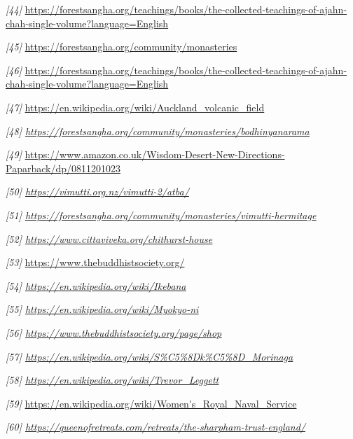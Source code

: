 \emph{{[}44{]}}
\url{https://forestsangha.org/teachings/books/the-collected-teachings-of-ajahn-chah-single-volume?language=English}

\emph{{[}45{]}} \url{https://forestsangha.org/community/monasteries}

\emph{{[}46{]}}
\url{https://forestsangha.org/teachings/books/the-collected-teachings-of-ajahn-chah-single-volume?language=English}

\emph{{[}47{]}}
\url{https://en.wikipedia.org/wiki/Auckland_volcanic_field}

\emph{{[}48{]}
\href{https://forestsangha.org/community/monasteries/bodhinyanarama}{\underline{https://forestsangha.org/community/monasteries/bodhinyanarama}}}

\emph{{[}49{]}}
\url{https://www.amazon.co.uk/Wisdom-Desert-New-Directions-Paparback/dp/0811201023}

\emph{{[}50{]}
\href{https://vimutti.org.nz/vimutti-2/atba/}{\underline{https://vimutti.org.nz/vimutti-2/atba/}}}

\emph{{[}51{]}
\href{https://forestsangha.org/community/monasteries/vimutti-hermitage}{\underline{https://forestsangha.org/community/monasteries/vimutti-hermitage}}}

\emph{{[}52{]}
\href{https://www.cittaviveka.org/chithurst-house}{\underline{https://www.cittaviveka.org/chithurst-house}}}

\emph{{[}53{]}} \url{https://www.thebuddhistsociety.org/}

\emph{{[}54{]}
\href{https://en.wikipedia.org/wiki/Ikebana}{\underline{https://en.wikipedia.org/wiki/Ikebana}}}

\emph{{[}55{]}
\href{https://en.wikipedia.org/wiki/Myokyo-ni}{\underline{https://en.wikipedia.org/wiki/Myokyo-ni}}}

\emph{{[}56{]}
\href{https://www.thebuddhistsociety.org/page/shop}{\underline{https://www.thebuddhistsociety.org/page/shop}}}

\emph{{[}57{]}
\href{https://en.wikipedia.org/wiki/Sōkō_Morinaga}{\underline{https://en.wikipedia.org/wiki/S\%C5\%8Dk\%C5\%8D\_Morinaga}}}

\emph{{[}58{]}
\href{https://en.wikipedia.org/wiki/Trevor_Leggett}{\underline{https://en.wikipedia.org/wiki/Trevor\_Leggett}}}

\emph{{[}59{]}}
\url{https://en.wikipedia.org/wiki/Women's_Royal_Naval_Service}

\emph{{[}60{]}
\href{https://queenofretreats.com/retreats/the-sharpham-trust-england/}{\underline{https://queenofretreats.com/retreats/the-sharpham-trust-england/}}}

